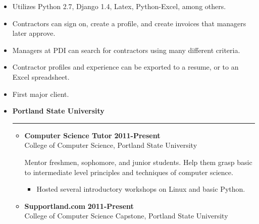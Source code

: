 \documentclass[overlapped]{res}
\begin{document}
\begin{resume}
\begin{itemize}[leftmargin=0in]
\begin{itemize}[leftmargin=0in]
\begin{samepage}
                    \begin{itemize}
                        \item[\textbullet] Utilizes Python 2.7, Django 1.4, Latex, Python-Excel, among others.
                        \item[\textbullet] Contractors can sign on, create a profile, and create invoices that managers later approve.
                        \item[\textbullet] Managers at PDI can search for contractors using many different criteria.
                        \item[\textbullet] Contractor profiles and experience can be exported to a resume, or to an Excel spreadsheet.
                        \item[\textbullet] First major client.
                    \end{itemize}
                \end{samepage}
        \end{itemize}
\end{itemize}

\vspace{0.25in}

\begin{itemize}[leftmargin=0in]
    \item[] \textbf{Portland State University} \\[-0.1in] \rule{\textwidth}{0.5pt}
        \begin{itemize}[leftmargin=0in]
            \item[] 
                \begin{samepage}
                    \textbf{Computer Science Tutor} \hfill \textbf{2011-Present} \\
                    College of Computer Science, Portland State University \hfill

                    Mentor freshmen, sophomore, and junior students. Help them grasp basic to intermediate level
                    principles and techniques of computer science.	
                    \begin{itemize}
                        \item[\textbullet] Hosted several introductory workshops on Linux and basic Python.
                    \end{itemize}
                \end{samepage}

            \item[] 
                \begin{samepage}
                    \textbf{Supportland.com} \hfill \textbf{2011-Present} \\
                    College of Computer Science Capstone, Portland State University \hfill


\end{samepage}
\end{itemize}
\end{itemize}
\end{resume}
\end{document}
